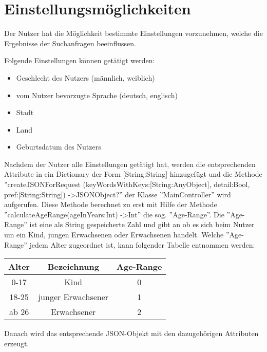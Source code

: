 
\chapter{Einstellungsmöglichkeiten}

Der Nutzer hat die Möglichkeit bestimmte Einstellungen vorzunehmen, welche die Ergebnisse der Suchanfragen beeinflussen.   

Folgende Einstellungen können getätigt werden:

\begin{itemize}
	\item Geschlecht des Nutzers (männlich, weiblich)
	\item vom Nutzer bevorzugte Sprache (deutsch, englisch)
	\item Stadt
	\item Land
	\item Geburtsdatum des Nutzers
\end{itemize}


Nachdem der Nutzer alle Einstellungen getätigt hat, werden die entsprechenden Attribute in
ein Dictionary der Form [String:String] hinzugefügt und die Methode ''createJSONForRequest
(keyWordsWithKeys:[String:AnyObject],
detail:Bool, pref:[String:String]) -\textgreater JSONObject?'' der Klasse ''MainController'' wird aufgerufen. Diese Methode berechnet zu erst mit Hilfe der Methode ''calculateAgeRange(ageInYears:Int) -\textgreater Int'' die sog. ''Age-Range''. Die ''Age-Range'' ist eine als String gespeicherte Zahl und gibt an ob es sich beim Nutzer um ein Kind, jungen Erwachsenen oder Erwachsenen handelt. Welche ''Age-Range'' jedem Alter zugeordnet ist, kann folgender Tabelle entnommen werden:

\begin{tabular}{c|c|c}
Alter & Bezeichnung & Age-Range \\
\hline
0-17 & Kind & 0 \\
18-25 & junger Erwachsener & 1 \\
ab 26 & Erwachsener & 2
\end{tabular}

Danach wird das entsprechende JSON-Objekt mit den dazugehörigen Attributen erzeugt.

